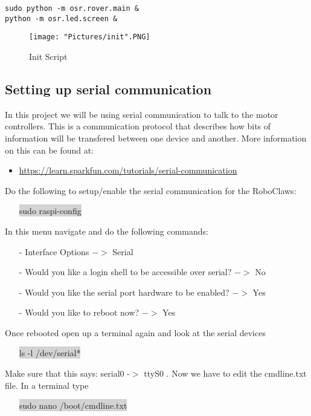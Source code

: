 \documentclass[12pt]{article}
\begin{document}
\begin{verbatim}
sudo python -m osr.rover.main &
python -m osr.led.screen &
\end{verbatim}

\begin{figure}[H]
 	\centering
	\texttt{[image: "Pictures/init".PNG]}
 	\caption{Init Script}
	\label{init}
\end{figure}

\subsection{Setting up serial communication}	

In this project we will be using serial communication to talk to the motor controllers. This is a communication protocol that describes how bits of information will be transfered between one device and another. More information on this can be found at:
\begin{itemize}
	\item \href{https://learn.sparkfun.com/tutorials/serial-communication}{https://learn.sparkfun.com/tutorials/serial-communication}
\end{itemize}

\noindent Do the following to setup/enable the serial communication for the RoboClaws:
\begin{itemize}
	\item[] \colorbox{lightgray}{sudo raspi-config}
\end{itemize}

\noindent In this menu navigate and do the following commands:
\begin{itemize}
	\item[-]  Interface Options $-> $ Serial 
	\item[-] Would you like a login shell to be accessible over serial? $->$ No
	\item[-] Would you like the serial port hardware to be enabled? $->$ Yes
	\item[-] Would you like to reboot now? $->$ Yes
\end{itemize} 
\noindent Once rebooted open up a terminal again and look at the serial devices	
\begin{itemize}
	\item[] \colorbox{lightgray}{ls -l /dev/serial*}
\end{itemize}
Make sure that this says: serial0 -$>$ ttyS0 . Now we have to edit the cmdline.txt file. In a terminal type
\begin{itemize}
	\item [] \colorbox{lightgray}{sudo nano /boot/cmdline.txt}
\end{itemize}
\end{document}

